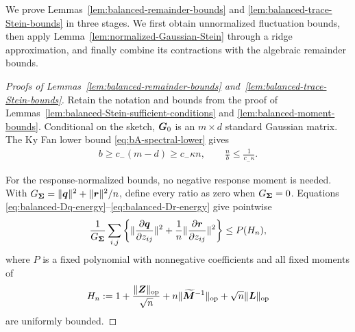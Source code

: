 \documentclass{article}
\theoremstyle{plain} %
\theoremstyle{definition} %
\theoremstyle{definition} %
\begin{document}
We prove Lemmas~\ref{lem:balanced-remainder-bounds} and
\ref{lem:balanced-trace-Stein-bounds} in three stages. We first obtain
unnormalized fluctuation bounds, then apply
Lemma~\ref{lem:normalized-Gaussian-Stein} through a ridge approximation,
and finally combine its contractions with the algebraic remainder bounds.

\begin{proof}[Proofs of Lemmas~\ref{lem:balanced-remainder-bounds}
and~\ref{lem:balanced-trace-Stein-bounds}]
Retain the notation and bounds from the proof of
Lemmas~\ref{lem:balanced-Stein-sufficient-conditions} and
\ref{lem:balanced-moment-bounds}.
Conditional on the sketch, $\boldsymbol{G}_0$ is an $m\times d$ standard Gaussian
matrix.  The Ky Fan lower bound \eqref{eq:bA-spectral-lower} gives
\begin{align}
    b\geq c_-(m-d)\geq c_-\kappa n,
    \qquad \frac{n}{b}\leq\frac{1}{c_-\kappa}.
    \label{eq:balanced-b-lower}
\end{align}

For the response-normalized bounds, no negative response moment is needed.
With
$G_{\boldsymbol{\Sigma}}=\lVert\boldsymbol{q}\rVert^2+\lVert\boldsymbol{r}\rVert^2/n$, define every ratio as zero when
$G_{\boldsymbol{\Sigma}}=0$.  Equations
\eqref{eq:balanced-Dq-energy}--\eqref{eq:balanced-Dr-energy} give pointwise
\begin{align}
    \frac{1}{G_{\boldsymbol{\Sigma}}}
    \sum_{i,j}\left\{
       \lVert\pdv{\boldsymbol{q}}{z_{ij}}\rVert^2
       +\frac1n\lVert\pdv{\boldsymbol{r}}{z_{ij}}\rVert^2
    \right\}
    \leq P(H_n),
    \label{eq:balanced-normalized-energy}
\end{align}
where $P$ is a fixed polynomial with nonnegative coefficients and
all fixed moments of
\begin{align*}
    H_n:=1+\frac{\lVert\boldsymbol{Z}\rVert_{\rm op}}{\sqrt n}
       +n\lVert\widetilde{\boldsymbol{M}}^{-1}\rVert_{\rm op}
       +\sqrt n\lVert\boldsymbol{L}\rVert_{\rm op}
\end{align*}
are uniformly bounded.


\end{proof}
\end{document}
